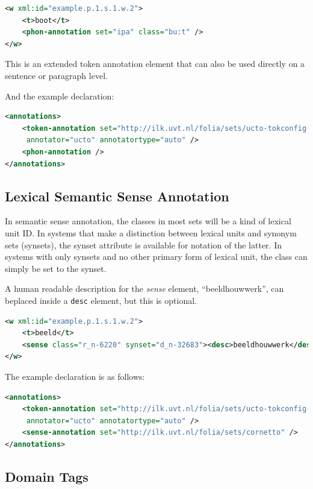 \documentclass[a4paper,12pt]{report}
\begin{document}
\begin{lstlisting}[language=xml]
<w xml:id="example.p.1.s.1.w.2">
    <t>boot</t>
    <phon-annotation set="ipa" class="bu:t" />
</w>
\end{lstlisting}

This is an extended token annotation element that can also be used directly on a sentence or paragraph level.

And the example declaration:

\begin{lstlisting}[language=xml]
<annotations>
    <token-annotation set="http://ilk.uvt.nl/folia/sets/ucto-tokconfig-nl" 
     annotator="ucto" annotatortype="auto" />
    <phon-annotation />
</annotations>
\end{lstlisting}

\subsection{Lexical Semantic Sense Annotation}

In semantic sense annotation, the classes in most sets will be a kind of lexical unit ID. In systems that make a distinction between lexical units and synonym sets (synsets), the synset attribute is available for notation of the latter. In systems with only synsets and no other primary form of lexical unit, the class can simply be set to the synset.

A human readable description for the \emph{sense} element, ``beeldhouwwerk'', can beplaced inside a \texttt{desc} element, but this is optional.

\begin{lstlisting}[language=xml]
<w xml:id="example.p.1.s.1.w.2">
    <t>beeld</t>
    <sense class="r_n-6220" synset="d_n-32683"><desc>beeldhouwwerk</desc></sense>
</w>
\end{lstlisting}

The example declaration is as follows:

\begin{lstlisting}[language=xml]
<annotations>
    <token-annotation set="http://ilk.uvt.nl/folia/sets/ucto-tokconfig-nl"
     annotator="ucto" annotatortype="auto" />
    <sense-annotation set="http://ilk.uvt.nl/folia/sets/cornetto" />
</annotations>
\end{lstlisting}

\subsection{Domain Tags}
\end{document}
